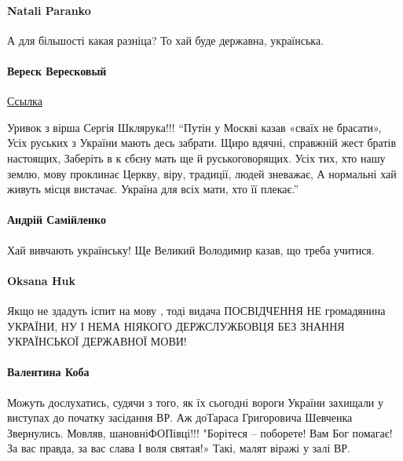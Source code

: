 \paragraph{Natali Paranko}
А для більшості какая разніца? То хай буде державна, українська.

\paragraph{Вереск Вересковый}
\href{https://www.facebook.com/profile.php?id=100026095720110&comment_id=Y29tbWVudDozNTY1Mjg1OTQwMTc1ODQ5XzM1NjU2NzQ4MzM0NzAyOTM%3D&__cft__[0]=AZXh9Wpmphhexq5-lKXWN0nHntp5tFgLubIoq71v8DN7O2Tmj2sC3toi8qyiSdjseCvI5FIi00eDafvumw_YkeZ3SEGgaWWYQxZFQhDzg8hI1GyLB7FyeHFoHtP0uThOVcI&__tn__=R]-R}{Ссылка}


Уривок з вірша Сергія Шклярука!!! \enquote{Путін у Москві казав «сваїх не брасати»,
Усіх руських з України мають десь забрати.
Щиро вдячні, справжній жест братів настоящих,
Заберіть в к єбєну мать ще й руськоговорящих.
Усіх тих, хто нашу землю, мову проклинає
Церкву, віру, традиції, людей зневажає,
А нормальні хай живуть місця вистачає.
Україна для всіх мати, хто її плекає.} 

\paragraph{Андрій Самійленко}
Хай вивчають українську! Ще Великий Володимир казав, що треба учитися.

\paragraph{Oksana Huk}

Якщо не здадуть іспит на мову , тоді видача ПОСВІДЧЕННЯ НЕ громадянина УКРАЇНИ,
НУ І НЕМА НІЯКОГО ДЕРЖСЛУЖБОВЦЯ БЕЗ ЗНАННЯ УКРАЇНСЬКОЇ ДЕРЖАВНОЇ МОВИ!

\paragraph{Валентина Коба}

Можуть дослухатись, судячи з того, як їх сьогодні вороги України захищали у
виступах до початку засідання ВР. Аж доТараса Григоровича Шевченка Звернулись.
Мовляв, шановніФОПівці!!! "Борітеся – поборете!
Вам Бог помагає!
За вас правда, за вас слава
І воля святая!»
Такі, малят віражі у залі ВР.

